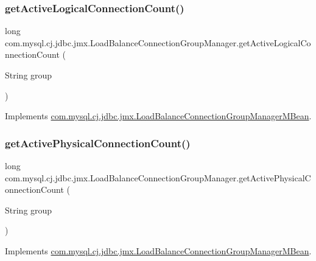 \subsubsection{\texorpdfstring{get\+Active\+Logical\+Connection\+Count()}{getActiveLogicalConnectionCount()}}
{\footnotesize\ttfamily long com.\+mysql.\+cj.\+jdbc.\+jmx.\+Load\+Balance\+Connection\+Group\+Manager.\+get\+Active\+Logical\+Connection\+Count (\begin{DoxyParamCaption}\item[{String}]{group }\end{DoxyParamCaption})}



Implements \mbox{\hyperlink{interfacecom_1_1mysql_1_1cj_1_1jdbc_1_1jmx_1_1_load_balance_connection_group_manager_m_bean_af5f3cc4063e3aa237e9774d5d2c161ab}{com.\+mysql.\+cj.\+jdbc.\+jmx.\+Load\+Balance\+Connection\+Group\+Manager\+M\+Bean}}.

\mbox{\label{classcom_1_1mysql_1_1cj_1_1jdbc_1_1jmx_1_1_load_balance_connection_group_manager_a386e3fbaa0dad1f3b0ca889a51bb8c4f}} 
\subsubsection{\texorpdfstring{get\+Active\+Physical\+Connection\+Count()}{getActivePhysicalConnectionCount()}}
{\footnotesize\ttfamily long com.\+mysql.\+cj.\+jdbc.\+jmx.\+Load\+Balance\+Connection\+Group\+Manager.\+get\+Active\+Physical\+Connection\+Count (\begin{DoxyParamCaption}\item[{String}]{group }\end{DoxyParamCaption})}



Implements \mbox{\hyperlink{interfacecom_1_1mysql_1_1cj_1_1jdbc_1_1jmx_1_1_load_balance_connection_group_manager_m_bean_a2ac28098b1dc44aab2a62b6a6730d9d7}{com.\+mysql.\+cj.\+jdbc.\+jmx.\+Load\+Balance\+Connection\+Group\+Manager\+M\+Bean}}.

